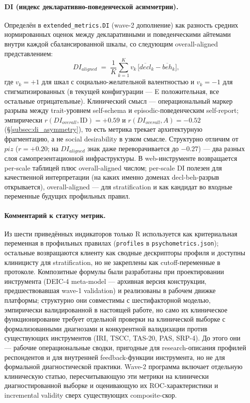 \paragraph{DI (индекс декларативно-поведенческой асимметрии).} Определён в \texttt{extended\_metrics.DI} (wave-2 дополнение) как разность средних нормированных оценок между декларативными и поведенческими айтемами внутри каждой сбалансированной шкалы, со следующим overall-aligned представлением:
\[
DI_{aligned} \;=\; \frac{1}{K}\sum_{k=1}^{K} v_k\,\bigl[\overline{decl}_k - \overline{beh}_k\bigr],
\]
где $v_k{=}{+}1$ для шкал с социально-желательной валентностью и $v_k{=}{-}1$ для стигматизированных (в текущей конфигурации --- E положительная, все остальные отрицательные). Клинический смысл --- операциональный маркер разрыва между trait-уровнем self-schema и episodic-поведенческим self-report; эмпирически $r(DI_{overall}, \text{ID}){=}{+}0.59$ и $r(DI_{overall}, A){=}{-}0.52$ (§\ref{subsec:di_asymmetry}), то есть метрика трекает архитектурную фрагментацию, а не social desirability в узком смысле. Структурно отличим от $piz$ ($r{=}{+}0.20$; на $DI_{aligned}$ знак даже переворачивается до $-0.27$) --- два разных слоя самопрезентационной инфраструктуры. В web-инструменте возвращается per-scale таблицей плюс overall-aligned числом; per-scale DI полезен для качественной интерпретации (на каких именно доменах decl-beh-разрыв открывается), overall-aligned --- для stratification и как кандидат во входные переменные будущих профильных правил.

\paragraph{Комментарий к статусу метрик.} Из шести приведённых индикаторов только R используется как критериальная переменная в профильных правилах (\texttt{profiles} в \texttt{psychometrics.json}); остальные возвращаются клиенту как сводные дескрипторы профиля и доступны клиницисту для stratification, но не закреплены как cutoff-переменные в протоколе. Композитные формулы были разработаны при проектировании инструмента (DEIC-4 meta-model --- архивная версия конструкции, предшествовавшая wave-1 validation) и реализованы в рабочем движке платформы; структурно они совместимы с шестифакторной моделью, эмпирически валидированной в настоящей работе, но само их клиническое функционирование требует отдельной проверки на клинической выборке с формализованными диагнозами и конкурентной валидизации против существующих инструментов (IRI, TSCC, TAS-20, PAS, SRP-4). До этого они --- рабочие операциональные сводки, пригодные для research-описания профилей респондентов и для внутренней feedback-функции инструмента, но не для формальной диагностической практики. Wave-2 программа включает отдельную клиническую статью, пересчитывающую эти метрики на клинически диагностированной выборке и оценивающую их ROC-характеристики и incremental validity сверх существующих composite-скор.

